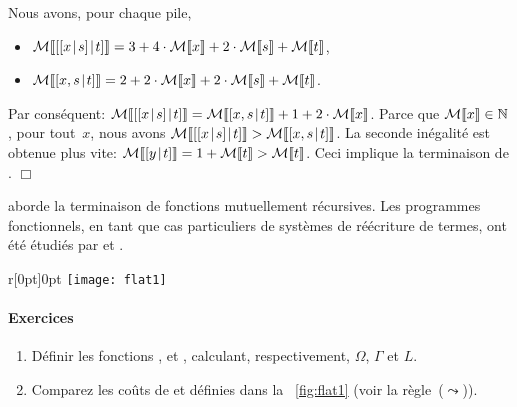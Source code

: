 Nous avons, pour chaque pile,
\begin{itemize}

  \item \(\mathcal{M}\llbracket{[{[{x}\!\mid\!{s}]}\!\mid\!{t}]}\rrbracket = 3 + 4\cdot\mathcal{M}\llbracket{x}\rrbracket +
    2\cdot\mathcal{M}\llbracket{s}\rrbracket + \mathcal{M}\llbracket{t}\rrbracket\),

  \item \(\mathcal{M}\llbracket{[{x,s}\!\mid\!{t}]}\rrbracket = 2 + 2\cdot\mathcal{M}\llbracket{x}\rrbracket +
    2\cdot\mathcal{M}\llbracket{s}\rrbracket + \mathcal{M}\llbracket{t}\rrbracket\).

\end{itemize}
Par conséquent: \(\mathcal{M}\llbracket{[{[{x}\!\mid\!{s}]}\!\mid\!{t}]}\rrbracket =
\mathcal{M}\llbracket{[{x,s}\!\mid\!{t}]}\rrbracket + 1 + 2\cdot\mathcal{M}\llbracket{x}\rrbracket\). Parce que
\(\mathcal{M}\llbracket{x}\rrbracket \in \mathbb{N}\), pour tout~\(x\), nous avons
\(\mathcal{M}\llbracket{[{[{x}\!\mid\!{s}]}\!\mid\!{t}]}\rrbracket > \mathcal{M}\llbracket{[{x,s}\!\mid\!{t}]}\rrbracket\). La
seconde inégalité est obtenue plus vite: \(\mathcal{M}\llbracket{[{y}\!\mid\!{t}]}\rrbracket = 1 +
\mathcal{M}\llbracket{t}\rrbracket > \mathcal{M}\llbracket{t}\rrbracket\). Ceci implique la terminaison de
.
\hfill\(\Box\)

\cite{Giesl_1997} aborde la terminaison de fonctions mutuellement
récursives. Les programmes fonctionnels, en tant que cas particuliers
de systèmes de réécriture de termes, ont été étudiés par
\cite{Giesl_1995b} et \cite{GieslWaltherBrauburger_1998}.

%
\begin{wrapfigure}[7]{r}[0pt]{0pt}
\centering
\texttt{[image: flat1]}
\caption{Aplatissement alternatif}
\label{fig:flat1}
\end{wrapfigure}
\paragraph{Exercices}

\begin{enumerate}

  \item Définir les fonctions ,  et
    , calculant, respectivement, \(\Omega\), \(\Gamma\)
    et \(L\).

  \item Comparez les coûts de  et
      définies dans la
    \fig~\ref{fig:flat1} (voir la règle~(\(\leadsto\))).

\end{enumerate}
